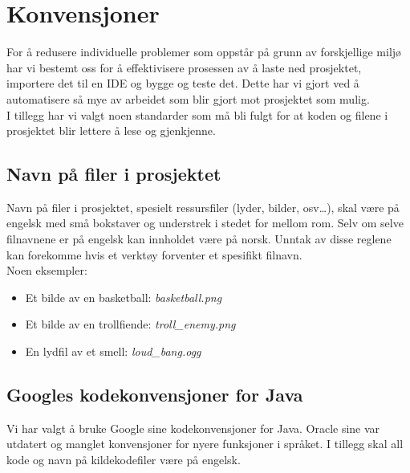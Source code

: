 \documentclass[12pt]{report}
\begin{document}
\newpage
\section*{Konvensjoner}

For {\aa} redusere individuelle problemer som oppst{\aa}r p{\aa} grunn av forskjellige milj{\o} har vi bestemt oss for
{\aa} effektivisere prosessen av {\aa} laste ned prosjektet, importere det til en IDE og bygge og teste det. Dette har
vi gjort ved {\aa} automatisere s{\aa} mye av arbeidet som blir gjort mot prosjektet som mulig.\\

I tillegg har vi valgt noen standarder som m{\aa} bli fulgt for at koden og filene i prosjektet blir lettere {\aa} lese
og gjenkjenne.\\

\subsection*{Navn p{\aa} filer i prosjektet}

Navn p{\aa} filer i prosjektet, spesielt ressursfiler (lyder, bilder, osv{\dots}), skal v{\ae}re p{\aa} engelsk med
sm{\aa} bokstaver og understrek i stedet for mellom rom. Selv om selve filnavnene er p{\aa} engelsk kan innholdet
v{\ae}re p{\aa} norsk. Unntak av disse reglene kan forekomme hvis et verkt{\o}y forventer et spesifikt filnavn.\\

Noen eksempler:
\begin{itemize}
\item Et bilde av en basketball: \textit{basketball.png}
\item Et bilde av en trollfiende: \textit{troll\_enemy.png}
\item En lydfil av et smell: \textit{loud\_bang.ogg}
\end{itemize}

\subsection*{Googles kodekonvensjoner for Java}

Vi har valgt {\aa} bruke Google sine kodekonvensjoner for Java. Oracle sine var utdatert og manglet konvensjoner for
nyere funksjoner i spr{\aa}ket. I tillegg skal all kode og navn p{\aa} kildekodefiler v{\ae}re p{\aa} engelsk.\\
\end{document}
